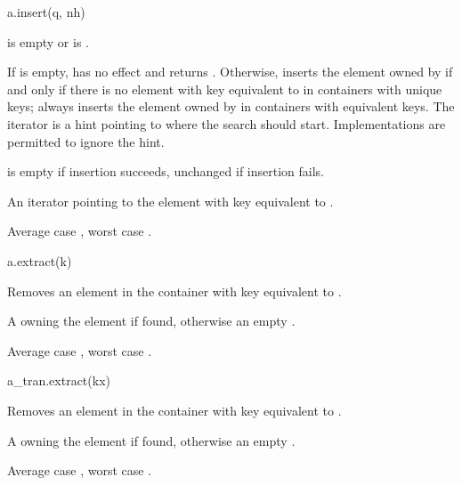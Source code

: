 %
\begin{itemdecl}
a.insert(q, nh)
\end{itemdecl}

\begin{itemdescr}
\pnum
\result
{}

\pnum
\expects
{} is empty or
 is .

\pnum
\effects
If  is empty, has no effect and returns .
Otherwise, inserts the element owned by  if and only if
there is no element with key equivalent to 
in containers with unique keys;
always inserts the element owned by 
in containers with equivalent keys.
The iterator  is a hint pointing to where the search should start.
Implementations are permitted to ignore the hint.

\pnum
\ensures
{} is empty if insertion succeeds, unchanged if insertion fails.

\pnum
\returns
An iterator pointing to the element with key equivalent to .

\pnum
\complexity
Average case , worst case .
\end{itemdescr}

%
\begin{itemdecl}
a.extract(k)
\end{itemdecl}

\begin{itemdescr}
\pnum
\result
{}

\pnum
\effects
Removes an element in the container with key equivalent to .

\pnum
\returns
A  owning the element if found,
otherwise an empty .

\pnum
\complexity
Average case , worst case .
\end{itemdescr}

%
\begin{itemdecl}
a_tran.extract(kx)
\end{itemdecl}

\begin{itemdescr}
\pnum
\result
{}

\pnum
\effects
Removes an element in the container with key equivalent to .

\pnum
\returns
A  owning the element if found,
otherwise an empty .

\pnum
\complexity
Average case , worst case .
\end{itemdescr}

